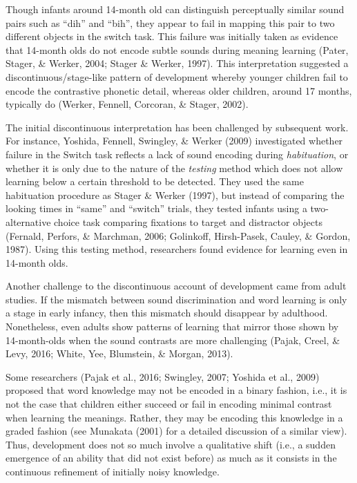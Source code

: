 \documentclass[english,,man]{apa6}
\begin{document}
Though infants around 14-month old can distinguish perceptually similar sound pairs such as \enquote{dih} and \enquote{bih}, they appear to fail in mapping this pair to two different objects in the switch task. This failure was initially taken as evidence that 14-month olds do not encode subtle sounds during meaning learning (Pater, Stager, \& Werker, 2004; Stager \& Werker, 1997). This interpretation suggested a discontinuous/stage-like pattern of development whereby younger children fail to encode the contrastive phonetic detail, whereas older children, around 17 months, typically do (Werker, Fennell, Corcoran, \& Stager, 2002).

The initial discontinuous interpretation has been challenged by subsequent work. For instance, Yoshida, Fennell, Swingley, \& Werker (2009) investigated whether failure in the Switch task reflects a lack of sound encoding during \emph{habituation}, or whether it is only due to the nature of the \emph{testing} method which does not allow learning below a certain threshold to be detected. They used the same habituation procedure as Stager \& Werker (1997), but instead of comparing the looking times in \enquote{same} and \enquote{switch} trials, they tested infants using a two-alternative choice task comparing fixations to target and distractor objects (Fernald, Perfors, \& Marchman, 2006; Golinkoff, Hirsh-Pasek, Cauley, \& Gordon, 1987). Using this testing method, researchers found evidence for learning even in 14-month olds.

Another challenge to the discontinuous account of development came from adult studies. If the mismatch between sound discrimination and word learning is only a stage in early infancy, then this mismatch should disappear by adulthood. Nonetheless, even adults show patterns of learning that mirror those shown by 14-month-olds when the sound contrasts are more challenging (Pajak, Creel, \& Levy, 2016; White, Yee, Blumstein, \& Morgan, 2013).

Some researchers (Pajak et al., 2016; Swingley, 2007; Yoshida et al., 2009) proposed that word knowledge may not be encoded in a binary fashion, i.e., it is not the case that children either succeed or fail in encoding minimal contrast when learning the meanings. Rather, they may be encoding this knowledge in a graded fashion (see Munakata (2001) for a detailed discussion of a similar view). Thus, development does not so much involve a qualitative shift (i.e., a sudden emergence of an ability that did not exist before) as much as it consists in the continuous refinement of initially noisy knowledge.
\end{document}
